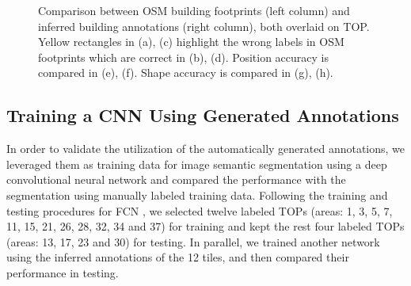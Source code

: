 \begin{figure}[H]
\begin{subfigure}{0.486\columnwidth}
   \caption{}  
 \end{subfigure} 
\caption{Comparison between OSM building footprints (left column) and inferred building annotations (right column), both overlaid on TOP. Yellow rectangles in (a), (c) highlight the wrong labels in OSM footprints which are correct in (b), (d). Position accuracy is compared in (e), (f). Shape accuracy is compared in (g), (h).}
\label{fig:vai_comp_osm}
\end{figure}


\subsection{Training a CNN Using Generated Annotations}
In order to validate the utilization of the automatically generated annotations, we leveraged them as training data for image semantic segmentation using a deep convolutional neural network and compared the performance with the segmentation using manually labeled training data. Following the training and testing procedures for FCN \cite{fcn}, we selected twelve labeled TOPs (areas: 1, 3, 5, 7, 11, 15, 21, 26, 28, 32, 34 and 37) for training and kept the rest four labeled TOPs (areas: 13, 17, 23 and 30) for testing. In parallel, we trained another network using the inferred annotations of the 12 tiles, and then compared their performance in testing.  

